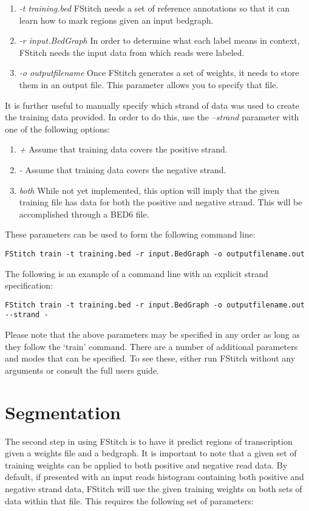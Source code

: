 \documentclass[12pt,letterpaper]{article}
\begin{document}
\begin{enumerate}
 \item \textit{-t training.bed} FStitch needs a set of reference annotations so that it can learn how to mark regions given an input bedgraph.
 \item \textit{-r input.BedGraph} In order to determine what each label means in context, FStitch needs the input data from which reads were labeled.
 \item \textit{-o outputfilename} Once FStitch generates a set of weights, it needs to store them in an output file. This parameter allows you to specify that file.
\end{enumerate}

It is further useful to manually specify which strand of data was used to create the training data provided. In order to do this, use the \textit{--strand} parameter
with one of the following options:

\begin{enumerate}
 \item \textit{+} Assume that training data covers the positive strand.
 \item \textit{-} Assume that training data covers the negative strand.
 \item \textit{both} While not yet implemented, this option will imply that the given training file has data for both the positive and negative strand. This will be accomplished through a BED6 file.
\end{enumerate}

These parameters can be used to form the following command line:
\begin{verbatim}
FStitch train -t training.bed -r input.BedGraph -o outputfilename.out
\end{verbatim}

The following is an example of a command line with an explicit strand specification:
\begin{verbatim}
FStitch train -t training.bed -r input.BedGraph -o outputfilename.out --strand -
\end{verbatim}

Please note that the above parameters may be specified in any order as long as they follow the `train' command.
There are a number of additional parameters and modes that can be specified. To see these, either run FStitch without any arguments or consult the full users guide.

\section{Segmentation}
The second step in using FStitch is to have it predict regions of transcription given a weights file and a bedgraph. It is important to note that a given set of training 
weights can be applied to both positive and negative read data. By default, if presented with an input reads histogram containing both positive and negative strand data, FStitch will 
use the given training weights on both sets of data within that file. This requires the following set of parameters:
\end{document}

